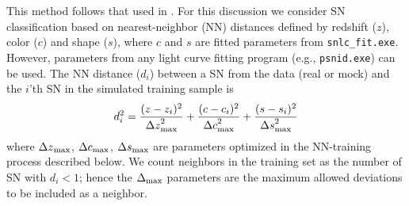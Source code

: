 \documentclass[12pt]{article}
\newcommand{\psnid}{{\tt psnid.exe}}
\begin{document}
\newcommand{\zsepmax}{{\Delta z}_{\rm max}}
\newcommand{\csepmax}{{\Delta c}_{\rm max}}
\newcommand{\ssepmax}{{\Delta s}_{\rm max}}
\newcommand{\Wfalse}{W_{\rm false}}
\newcommand{\Nfalse}{N_{\rm false}}
\newcommand{\Ntrue}{N_{\rm true}^{\rm Ia-tag}}

This method follows that used in \cite{Sako2014}.
%
%
For this discussion we consider SN classification based
on nearest-neighbor (NN) distances defined by
redshift ($z$), color ($c$) and shape ($s$),
where $c$ and $s$ are fitted parameters from {\tt snlc\_fit.exe}.
However, parameters from any light curve fitting program 
(e.g., {\psnid}) can be used. 
The NN distance ($d_i$) between a SN from 
the data (real or mock) and the $i$'th SN in the 
simulated training sample is
%
\begin{equation}
  d_i^2 =  \frac{(z - z_i)^2}{\zsepmax^2} +
           \frac{(c - c_i)^2}{\csepmax^2} +
           \frac{(s - s_i)^2}{\ssepmax^2}
\end{equation}
%
where $\zsepmax$, $\csepmax$, $\ssepmax$ are parameters 
optimized in the NN-training process described below.
We count neighbors in the training set as the number of
SN with $d_i < 1$;
hence the $\Delta_{\rm max}$ parameters are the maximum
allowed deviations to be included as a neighbor.
\end{document}
